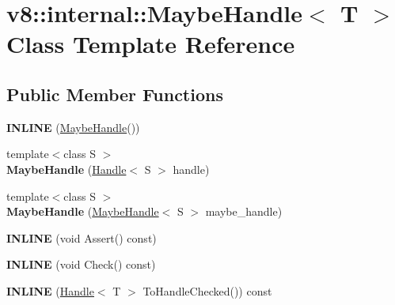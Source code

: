 \hypertarget{classv8_1_1internal_1_1_maybe_handle}{}\section{v8\+:\+:internal\+:\+:Maybe\+Handle$<$ T $>$ Class Template Reference}
\label{classv8_1_1internal_1_1_maybe_handle}
\subsection*{Public Member Functions}
\begin{DoxyCompactItemize}
\item 
\hypertarget{classv8_1_1internal_1_1_maybe_handle_ac02ec0ec530544f6b29e854cd599a1ab}{}{\bfseries I\+N\+L\+I\+N\+E} (\hyperlink{classv8_1_1internal_1_1_maybe_handle}{Maybe\+Handle}())\label{classv8_1_1internal_1_1_maybe_handle_ac02ec0ec530544f6b29e854cd599a1ab}

\item 
\hypertarget{classv8_1_1internal_1_1_maybe_handle_a9eff42938b2b6245b6df7eb7ea0992ed}{}{\footnotesize template$<$class S $>$ }\\{\bfseries Maybe\+Handle} (\hyperlink{classv8_1_1internal_1_1_handle}{Handle}$<$ S $>$ handle)\label{classv8_1_1internal_1_1_maybe_handle_a9eff42938b2b6245b6df7eb7ea0992ed}

\item 
\hypertarget{classv8_1_1internal_1_1_maybe_handle_a16868e92aa215c7b76971da65f5b4d05}{}{\footnotesize template$<$class S $>$ }\\{\bfseries Maybe\+Handle} (\hyperlink{classv8_1_1internal_1_1_maybe_handle}{Maybe\+Handle}$<$ S $>$ maybe\+\_\+handle)\label{classv8_1_1internal_1_1_maybe_handle_a16868e92aa215c7b76971da65f5b4d05}

\item 
\hypertarget{classv8_1_1internal_1_1_maybe_handle_a47d2e896ceac6a2270e7b0b1b9c65863}{}{\bfseries I\+N\+L\+I\+N\+E} (void Assert() const)\label{classv8_1_1internal_1_1_maybe_handle_a47d2e896ceac6a2270e7b0b1b9c65863}

\item 
\hypertarget{classv8_1_1internal_1_1_maybe_handle_a71a8dfc784e8734fe394b34f81deba8d}{}{\bfseries I\+N\+L\+I\+N\+E} (void Check() const)\label{classv8_1_1internal_1_1_maybe_handle_a71a8dfc784e8734fe394b34f81deba8d}

\item 
\hypertarget{classv8_1_1internal_1_1_maybe_handle_a0407c5b9010779d405408fb895f33af2}{}{\bfseries I\+N\+L\+I\+N\+E} (\hyperlink{classv8_1_1internal_1_1_handle}{Handle}$<$ T $>$ To\+Handle\+Checked()) const \label{classv8_1_1internal_1_1_maybe_handle_a0407c5b9010779d405408fb895f33af2}


\end{DoxyCompactItemize}

